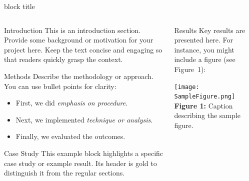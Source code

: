 \documentclass[final]{beamer}
\begin{document}
\begin{frame}[t]
\begin{beamercolorbox}[wd=\paperwidth, colsep=0.5cm]{block title}
\begin{minipage}[c]{0.15\textwidth}
    \end{minipage}
  \end{beamercolorbox}

  \vspace{1cm}  %

  \begin{columns}[t]

    \begin{column}{\colwidth}
      \begin{block}{Introduction}
        This is an introduction section. Provide some background or motivation for your project here. 
        Keep the text concise and engaging so that readers quickly grasp the context.
      \end{block}

      \begin{block}{Methods}
        Describe the methodology or approach. You can use bullet points for clarity:
        \begin{itemize}
          \item First, we did \textit{emphasis on procedure}.
          \item Next, we implemented \textit{technique or analysis}.
          \item Finally, we evaluated the outcomes.
        \end{itemize}
      \end{block}

      \begin{exampleblock}{Case Study}
        This example block highlights a specific case study or example result. 
        Its header is gold to distinguish it from the regular sections.
      \end{exampleblock}
    \end{column}

    \separatorcolumn

    \begin{column}{\colwidth}
      \begin{block}{Results}
        Key results are presented here. For instance, you might include a figure (see Figure 1):
        \begin{center}
          \texttt{[image: SampleFigure.png]}\\
          {\small \textbf{Figure 1:} Caption describing the sample figure.}
        \end{center}


\end{block}
\end{column}
\end{columns}
\end{frame}
\end{document}
